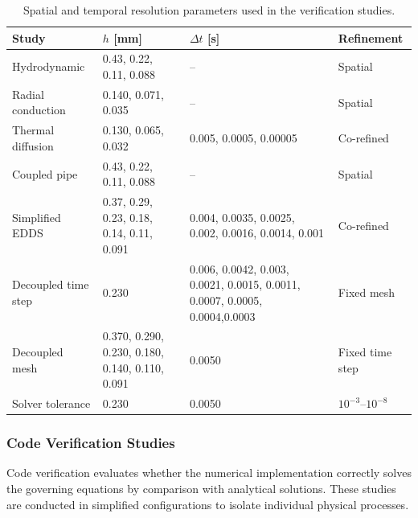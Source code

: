 \begin{table}[htbp]
    \centering
    \caption{Spatial and temporal resolution parameters used in the verification studies.}
    \begin{tabular}{P{2.75cm}P{4.25cm}P{5.45cm}P{2.3cm}}
        \toprule
        Study & $h$ [mm] & $\Delta t$ [s] & Refinement \\
        \midrule
        Hydrodynamic
            & 0.43, 0.22, 0.11, 0.088
            & --
            & Spatial \\

        Radial conduction
            & 0.140, 0.071, 0.035
            & --
            & Spatial \\

        Thermal diffusion
            & 0.130, 0.065, 0.032
            & 0.005, 0.0005, 0.00005
            & Co-refined \\

        Coupled pipe
            & 0.43, 0.22, 0.11, 0.088
            & --
            & Spatial \\

        Simplified EDDS
            & 0.37, 0.29, 0.23, 0.18, 0.14, 0.11, 0.091
            & 0.004, 0.0035, 0.0025, 0.002, 0.0016, 0.0014, 0.001
            & Co-refined \\

        Decoupled time step
            & 0.230
            & 0.006, 0.0042, 0.003, 0.0021, 0.0015, 0.0011, 0.0007, 0.0005, 0.0004,0.0003
            & Fixed mesh \\

        Decoupled mesh
            & 0.370, 0.290, 0.230, 0.180, 0.140, 0.110, 0.091
            & 0.0050
            & Fixed time step \\

        Solver tolerance
            & 0.230
            & 0.0050
            & $10^{-3}$--$10^{-8}$ \\
        \bottomrule
    \end{tabular}
    \label{tab:resolutions}
\end{table}

\subsubsection{Code Verification Studies}
Code verification evaluates whether the numerical implementation correctly solves the governing equations by comparison with analytical solutions. These studies are conducted in simplified configurations to isolate individual physical processes.

